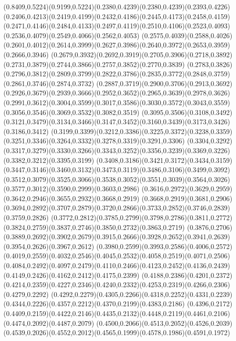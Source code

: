 \PST@Solid(0.8409,0.5224)(0.9199,0.5224)\PST@Solid(0.2380,0.4239)(0.2380,0.4239)(0.2393,0.4226)(0.2406,0.4213)(0.2419,0.4199)(0.2432,0.4186)(0.2445,0.4173)(0.2458,0.4159)
(0.2471,0.4146)(0.2484,0.4133)(0.2497,0.4119)(0.2510,0.4106)(0.2523,0.4093)(0.2536,0.4079)(0.2549,0.4066)(0.2562,0.4053)
(0.2575,0.4039)(0.2588,0.4026)(0.2601,0.4012)(0.2614,0.3999)(0.2627,0.3986)(0.2640,0.3972)(0.2653,0.3959)(0.2666,0.3946)
(0.2679,0.3932)(0.2692,0.3919)(0.2705,0.3906)(0.2718,0.3892)(0.2731,0.3879)(0.2744,0.3866)(0.2757,0.3852)(0.2770,0.3839)
(0.2783,0.3826)(0.2796,0.3812)(0.2809,0.3799)(0.2822,0.3786)(0.2835,0.3772)(0.2848,0.3759)(0.2861,0.3746)(0.2874,0.3732)
(0.2887,0.3719)(0.2900,0.3706)(0.2913,0.3692)(0.2926,0.3679)(0.2939,0.3666)(0.2952,0.3652)(0.2965,0.3639)(0.2978,0.3626)
(0.2991,0.3612)(0.3004,0.3599)(0.3017,0.3586)(0.3030,0.3572)(0.3043,0.3559)(0.3056,0.3546)(0.3069,0.3532)(0.3082,0.3519)
(0.3095,0.3506)(0.3108,0.3492)(0.3121,0.3479)(0.3134,0.3466)(0.3147,0.3452)(0.3160,0.3439)(0.3173,0.3426)(0.3186,0.3412)
(0.3199,0.3399)(0.3212,0.3386)(0.3225,0.3372)(0.3238,0.3359)(0.3251,0.3346)(0.3264,0.3332)(0.3278,0.3319)(0.3291,0.3306)
(0.3304,0.3292)(0.3317,0.3279)(0.3330,0.3266)(0.3343,0.3252)(0.3356,0.3239)(0.3369,0.3226)(0.3382,0.3212)(0.3395,0.3199)
(0.3408,0.3186)(0.3421,0.3172)(0.3434,0.3159)(0.3447,0.3146)(0.3460,0.3132)(0.3473,0.3119)(0.3486,0.3106)(0.3499,0.3092)
(0.3512,0.3079)(0.3525,0.3066)(0.3538,0.3052)(0.3551,0.3039)(0.3564,0.3026)(0.3577,0.3012)(0.3590,0.2999)(0.3603,0.2986)
(0.3616,0.2972)(0.3629,0.2959)(0.3642,0.2946)(0.3655,0.2932)(0.3668,0.2919)
\PST@Solid(0.3668,0.2919)(0.3681,0.2906)(0.3694,0.2892)(0.3707,0.2879)(0.3720,0.2866)(0.3733,0.2852)(0.3746,0.2839)(0.3759,0.2826)
(0.3772,0.2812)(0.3785,0.2799)(0.3798,0.2786)(0.3811,0.2772)(0.3824,0.2759)(0.3837,0.2746)(0.3850,0.2732)(0.3863,0.2719)
(0.3876,0.2706)(0.3889,0.2692)(0.3902,0.2679)(0.3915,0.2666)(0.3928,0.2652)(0.3941,0.2639)(0.3954,0.2626)(0.3967,0.2612)
(0.3980,0.2599)(0.3993,0.2586)(0.4006,0.2572)(0.4019,0.2559)(0.4032,0.2546)(0.4045,0.2532)(0.4058,0.2519)(0.4071,0.2506)
(0.4084,0.2492)(0.4097,0.2479)(0.4110,0.2466)(0.4123,0.2452)(0.4136,0.2439)(0.4149,0.2426)(0.4162,0.2412)(0.4175,0.2399)
(0.4188,0.2386)(0.4201,0.2372)(0.4214,0.2359)(0.4227,0.2346)(0.4240,0.2332)(0.4253,0.2319)(0.4266,0.2306)(0.4279,0.2292)
(0.4292,0.2279)(0.4305,0.2266)(0.4318,0.2252)(0.4331,0.2239)(0.4344,0.2226)(0.4357,0.2212)(0.4370,0.2199)(0.4383,0.2186)
(0.4396,0.2172)(0.4409,0.2159)(0.4422,0.2146)(0.4435,0.2132)(0.4448,0.2119)(0.4461,0.2106)(0.4474,0.2092)(0.4487,0.2079)
(0.4500,0.2066)(0.4513,0.2052)(0.4526,0.2039)(0.4539,0.2026)(0.4552,0.2012)(0.4565,0.1999)(0.4578,0.1986)(0.4591,0.1972)
